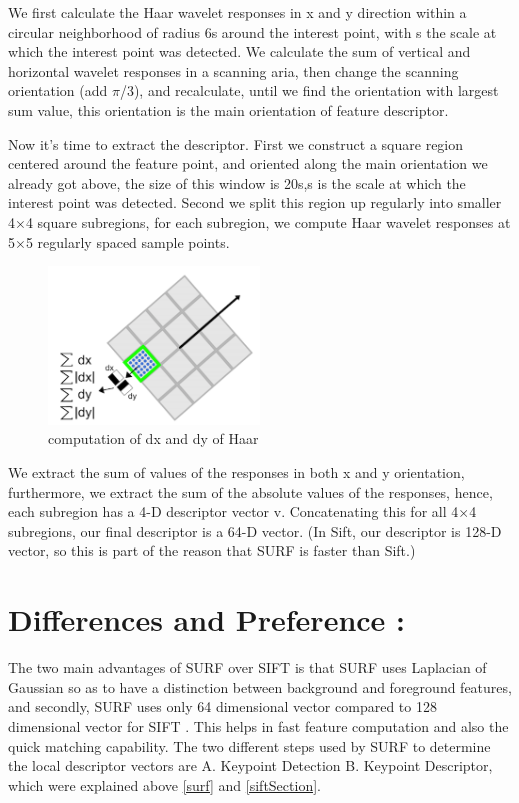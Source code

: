 We first calculate the Haar wavelet responses in x and y direction within a circular neighborhood of radius 6s around the interest point, with s the scale at which the interest point was detected. We calculate the sum of vertical and horizontal wavelet responses in a scanning aria, then change the scanning orientation (add $\pi$/3), and recalculate, until we find the orientation with largest sum value, this orientation is the main orientation of feature descriptor.

Now it’s time to extract the descriptor. First we construct a square region centered around the feature point, and oriented along the main orientation we already got above, the size of this window is 20s,s is the scale at which the interest point was detected. Second we split this region up regularly into smaller 4$\times$4 square subregions, for each subregion, we compute Haar wavelet responses at 5$\times$5 regularly spaced sample points.


\begin{figure}[H]
\centering
\includegraphics[width=0.5\textwidth]{img/surf5.png}
\caption{computation of dx and dy of Haar  }
\label{fig:surf5}
\end{figure}

We extract the sum of values of the responses in both x and y orientation, furthermore, we extract the sum of the absolute values of the responses, hence, each subregion has a 4-D descriptor vector v. Concatenating this for all 4$\times$4 subregions, our final descriptor is a 64-D vector. (In Sift, our descriptor is 128-D vector, so this is part of the reason that SURF is faster than Sift.)\\


\section{Differences and Preference :}
The two main advantages of SURF over SIFT is that SURF uses Laplacian of Gaussian so as to have a distinction
between background and foreground features, and secondly, SURF uses only 64 dimensional vector compared to 128 dimensional vector for SIFT . This helps in fast feature computation and also the quick matching capability.
The two different steps used by SURF to determine the local descriptor vectors are A. Keypoint Detection B. Keypoint Descriptor, which were  explained above \ref{surf} and \ref{siftSection}.


